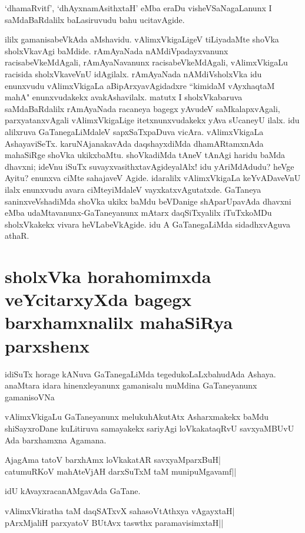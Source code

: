 `dhamaRvitf', `dhAyxnamAsithxtaH' eMba eraDu visheVSaNagaLanunx I saMdaBaRdalilx baLasiruvudu bahu ucitavAgide. 

ililx gamanisabeVkAda aMshavidu. vAlimxVkigaLigeV tiLiyadaMte shoVka sholxVkavAgi baMdide. rAmAyaNada nAMdiVpadayxvanunx racisabeVkeMdAgali, rAmAyaNavanunx racisabeVkeMdAgali, vAlimxVkigaLu racisida sholxVkaveVnU idAgilalx. rAmAyaNada nAMdiVsholxVka idu enunxvudu vAlimxVkigaLa aBipArxyavAgidadxre ``kimidaM vAyxhaqtaM mahA" enunxvudakekx avakAshavilalx. matutx I sholxVkabaruva saMdaBaRdalilx rAmAyaNada racaneya bagegx yAvudeV saMkalapxvAgali, parxyatanxvAgali vAlimxVkigaLige itetxnunxvudakekx yAva sUcaneyU ilalx. idu alilxruva GaTanegaLiMdaleV sapxSaTxpaDuva vicAra. vAlimxVkigaLa AshayaviSeTx. karuNAjanakavAda daqshayxdiMda dhamARtamxnAda mahaSiRge shoVka ukikxbaMtu. shoVkadiMda tAneV tAnAgi haridu baMda dhavxni; ideVnu iSuTx suvayxvasithxtavAgideyalAlx! idu yAriMdAdudu? heVge Ayitu? enunxva ciMte sahajaveV Agide. idaralilx vAlimxVkigaLa keYvADaveVnU ilalx enunxvudu avara ciMteyiMdaleV vayxkatxvAgutatxde. GaTaneya saninxveVshadiMda shoVka ukikx baMdu beVDanige shAparUpavAda dhavxni eMba udaMtavanunx-GaTaneyanunx mAtarx daqSiTxyalilx iTuTxkoMDu sholxVkakekx vivara heVLabeVkAgide. idu A GaTanegaLiMda sidadhxvAguva athaR. 

\section*{sholxVka horahomimxda veYcitarxyXda bagegx barxhamxnalilx mahaSiRya parxshenx} 

idiSuTx horage kANuva GaTanegaLiMda tegedukoLaLxbahudAda Ashaya. anaMtara idara hinenxleyanunx gamanisalu muMdina GaTaneyanunx gamanisoVNa 


vAlimxVkigaLu GaTaneyanunx melukuhAkutAtx Asharxmakekx baMdu shiSayxroDane kuLitiruva samayakekx sariyAgi loVkakataqRvU savxyaMBUvU Ada barxhamxna Agamana. 


\begin{shloka}
AjagAma tatoV barxhAmx loVkakatAR savxyaMparxBuH|\label{202}\\ 
catumuRKoV mahAteVjAH darxSuTxM taM munipuMgavamf||
\end{shloka}
idU kAvayxracanAMgavAda GaTane. 

\begin{shloka} 
vAlimxVkiratha taM daqSATxvX sahasoVtAthxya vAgayxtaH|\label{202a}\\ 
pArxMjaliH parxyatoV BUtAvx taswthx paramavisimxtaH||
\end{shloka}

